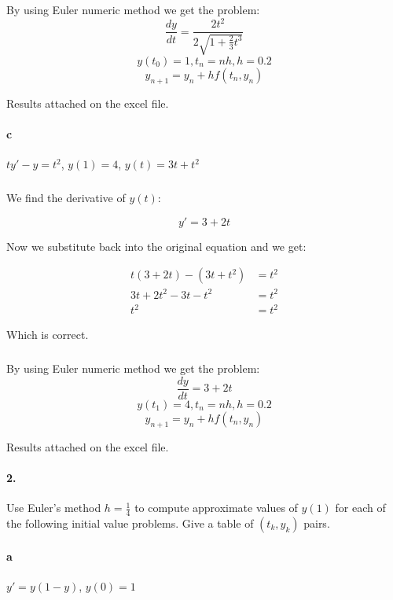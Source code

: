 \documentclass{article}
\begin{document}
\subparagraph{} By using Euler numeric method we get the problem:
\[
    \frac{dy}{dt} = \frac{2t^2}{2\sqrt{1+\frac{2}{3}t^{3}}}
\]
\[
    y(t_0) = 1, t_n = nh, h = 0.2
\]
\[
    y_{n+1} = y_n + hf(t_n,y_n)
\]

Results attached on the excel file.

\paragraph{c} $ty' - y = t^{2}$, $y(1)=4$, $y(t)=3t + t^{2}$

\subparagraph{} We find the derivative of $y(t)$:

\[
    y' = 3 + 2t
\]

Now we substitute back into the original equation and we get:

\begin{align*}
    t(3 + 2t) - (3t + t^{2}) &= t^{2}\\
    3t + 2t^{2} - 3t - t^{2} &= t^{2}\\
    t^{2} &= t^{2}
\end{align*}

Which is correct.

\subparagraph{} By using Euler numeric method we get the problem:
\[
    \frac{dy}{dt} = 3 + 2t
\]
\[
    y(t_1) = 4, t_n = nh, h = 0.2
\]
\[
    y_{n+1} = y_n + hf(t_n,y_n)
\]

Results attached on the excel file.

\newpage

\paragraph{2.} Use Euler's method $h = \frac{1}{4}$ to compute approximate values of $y(1)$ for each of the following initial value problems. Give a table of $(t_k, y_k)$ pairs.

\paragraph{a} $y' = y(1-y)$, $y(0)=1$
\end{document}

